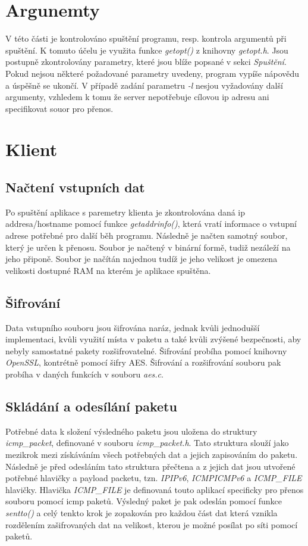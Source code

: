 \documentclass[a4paper, 11pt]{article}
\begin{document}
\section{Argunemty}
V této části je kontrolováno spuštění programu, resp. kontrola argumentů při spuštění. K tomuto účelu je využita funkce \textit{getopt()} z knihovny \textit{getopt.h}. Jsou postupně zkontrolovány parametry, které jsou blíže popsané v sekci \textit{Spuštění}. Pokud nejsou některé požadované parametry uvedeny, program vypíše nápovědu a úspěšně se ukončí. V případě zadání parametru \textit{-l} nesjou vyžadovány další argumenty, vzhledem k tomu že server nepotřebuje cílovou ip adresu ani specifikovat souor pro přenos.

\newpage
\section{Klient}

\subsection{Načtení vstupních dat}
Po spuštění aplikace s paremetry klienta je zkontrolována daná ip addresa/hostname pomocí funkce \textit{getaddrinfo()}, která vratí informace o vstupní adrese potřebné pro další běh programu. Následně je načten samotný soubor, který je určen k přenosu. Soubor je načtený v binární formě, tudiž nezáleží na jeho připoně. Soubor je načítán najednou tudíž je jeho velikost je omezena velikosti dostupné RAM na kterém je aplikace spuštěna.

\subsection{Šifrování}
Data vstupního souboru jsou šifrována naráz, jednak kvůli jednodušší implementaci, kvůli využití místa v paketu a také kvůli zvýšené bezpečnosti, aby nebyly samostatné pakety rozšifrovatelné. Šifrování probíha pomocí knihovny \textit{OpenSSL}, kontrétně pomocí šifry AES. Šifrování a rozšifrování souboru pak probíha v daných funkcích v souboru \textit{aes.c}.

\subsection{Skládání a odesílání paketu}
Potřebné data k složení výsledného paketu jsou uložena do struktury \textit{icmp\_packet}, definované v souboru \textit{icmp\_packet.h}. Tato struktura slouží jako mezikrok mezi získáváním všech potřebných dat a jejich zapisováním do paketu. Následně je před odesláním tato struktura přečtena a z jejich dat jsou utvořené potřebné hlavičky a payload packetu, tzn. \textit{IP\/IPv6}, \textit{ICMP\/ICMPv6} a \textit{ICMP\_FILE} hlavičky. Hlavička \textit{ICMP\_FILE} je definovaná touto aplikací specificky pro přenos souboru pomocí icmp paketů. Výsledný paket je pak odeslán pomocí funkce \textit{sentto()} a celý tenkto krok je zopakován pro každou část dat  která vznikla rozdělením zašifrovaných dat na velikost, kterou je možné posílat po síti pomocí paketů.
\end{document}
